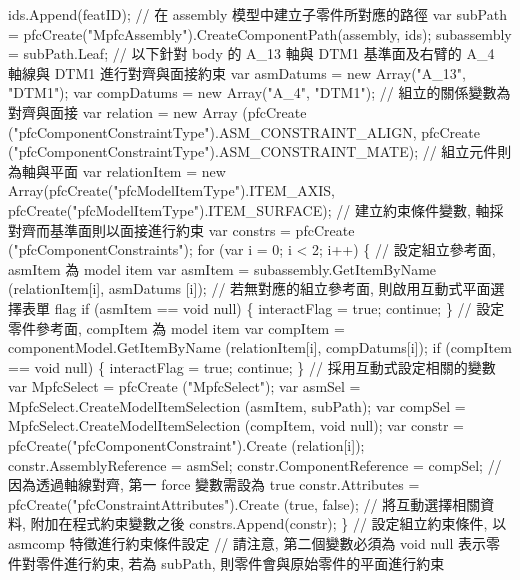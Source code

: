 \documentclass[]{article}
\newenvironment{Shaded}{}{}
\newcommand{\StringTok}[1]{\textcolor[rgb]{0.25,0.44,0.63}{{#1}}}
\begin{document}
\begin{Shaded}
\begin{Highlighting}[]
\StringTok{ids.Append(featID);}
\StringTok{// 在 assembly 模型中建立子零件所對應的路徑}
\StringTok{var subPath = pfcCreate("MpfcAssembly").CreateComponentPath(assembly, ids);}
\StringTok{subassembly = subPath.Leaf;}
\StringTok{// 以下針對 body 的 A_13 軸與 DTM1 基準面及右臂的  A_4 軸線與 DTM1 進行對齊與面接約束}
\StringTok{var asmDatums = new Array("A_13", "DTM1");}
\StringTok{var compDatums = new Array("A_4", "DTM1");}
\StringTok{// 組立的關係變數為對齊與面接}
\StringTok{var relation = new Array (pfcCreate ("pfcComponentConstraintType").ASM_CONSTRAINT_ALIGN, pfcCreate ("pfcComponentConstraintType").ASM_CONSTRAINT_MATE);}
\StringTok{// 組立元件則為軸與平面}
\StringTok{var relationItem = new Array(pfcCreate("pfcModelItemType").ITEM_AXIS, pfcCreate("pfcModelItemType").ITEM_SURFACE);}
\StringTok{// 建立約束條件變數, 軸採對齊而基準面則以面接進行約束}
\StringTok{var constrs = pfcCreate ("pfcComponentConstraints");}
\StringTok{for (var i = 0; i < 2; i++)}
\StringTok{\{}
\StringTok{                  // 設定組立參考面, asmItem 為 model item}
\StringTok{    var asmItem = subassembly.GetItemByName (relationItem[i], asmDatums [i]);}
\StringTok{                  // 若無對應的組立參考面, 則啟用互動式平面選擇表單 flag}
\StringTok{    if (asmItem == void null)}
\StringTok{    \{}
\StringTok{        interactFlag = true;}
\StringTok{        continue;}
\StringTok{    \}}
\StringTok{                  // 設定零件參考面, compItem 為 model item}
\StringTok{    var compItem = componentModel.GetItemByName (relationItem[i], compDatums[i]);}
\StringTok{    if (compItem == void null)}
\StringTok{    \{}
\StringTok{        interactFlag = true;}
\StringTok{        continue;}
\StringTok{    \}}
\StringTok{                  // 採用互動式設定相關的變數}
\StringTok{    var MpfcSelect = pfcCreate ("MpfcSelect");}
\StringTok{    var asmSel = MpfcSelect.CreateModelItemSelection (asmItem, subPath);}
\StringTok{    var compSel = MpfcSelect.CreateModelItemSelection (compItem, void null);}
\StringTok{    var constr = pfcCreate("pfcComponentConstraint").Create (relation[i]);}
\StringTok{    constr.AssemblyReference  = asmSel;}
\StringTok{    constr.ComponentReference = compSel;}
\StringTok{                  // 因為透過軸線對齊, 第一 force 變數需設為 true}
\StringTok{    constr.Attributes = pfcCreate("pfcConstraintAttributes").Create (true, false);}
\StringTok{                  // 將互動選擇相關資料, 附加在程式約束變數之後}
\StringTok{    constrs.Append(constr);}
\StringTok{\}}
\StringTok{// 設定組立約束條件, 以 asmcomp 特徵進行約束條件設定}
\StringTok{// 請注意, 第二個變數必須為 void null 表示零件對零件進行約束, 若為 subPath, 則零件會與原始零件的平面進行約束}

\end{Highlighting}
\end{Shaded}
\end{document}
